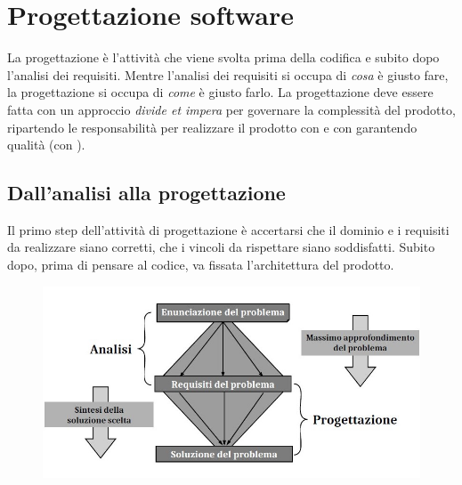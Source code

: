 \documentclass[../main]{subfiles}
\begin{document}
\section{Progettazione software}
La progettazione è l'attività che viene svolta prima della codifica e subito dopo l'analisi dei requisiti. Mentre l'analisi dei requisiti si occupa di \textit{cosa} è giusto fare, la progettazione si occupa di \textit{come} è giusto farlo.\newline
La progettazione deve essere fatta con un approccio \textit{divide et impera} per governare la complessità del prodotto, ripartendo le responsabilità per realizzare il prodotto con  e con garantendo qualità (con ).
\subsection{Dall'analisi alla progettazione}
Il primo step dell'attività di progettazione è accertarsi che il dominio e i requisiti da realizzare siano corretti, che i vincoli da rispettare siano soddisfatti. Subito dopo, prima di pensare al codice, va fissata l'architettura del prodotto.
\begin{figure}[h]
    \begin{center}
        \includegraphics[scale=0.6]{immagini/progettazione.jpg}
    \end{center}
\end{figure}
\end{document}
